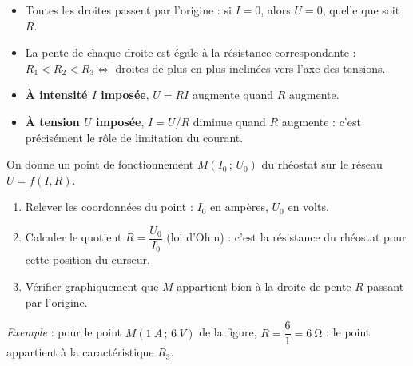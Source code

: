 \documentclass[11pt]{article}
\begin{document}
\begin{aretenir}
\begin{itemize}
\item Toutes les droites passent par l'origine : si $I = 0$, alors $U = 0$, quelle que soit $R$.
\item La pente de chaque droite est égale à la résistance correspondante : $R_1 < R_2 < R_3 \iff$ droites de plus en plus inclinées vers l'axe des tensions.
\item \textbf{À intensité $I$ imposée}, $U = R I$ augmente quand $R$ augmente.
\item \textbf{À tension $U$ imposée}, $I = U/R$ diminue quand $R$ augmente : c'est précisément le rôle de limitation du courant.
\end{itemize}
\end{aretenir}

\begin{methode}
On donne un point de fonctionnement $M(I_0\,;\,U_0)$ du rhéostat sur le réseau $U = f(I, R)$.
\begin{enumerate}
\item Relever les coordonnées du point : $I_0$ en ampères, $U_0$ en volts.
\item Calculer le quotient $R = \dfrac{U_0}{I_0}$ (loi d'Ohm) : c'est la résistance du rhéostat pour cette position du curseur.
\item Vérifier graphiquement que $M$ appartient bien à la droite de pente $R$ passant par l'origine.
\end{enumerate}
\emph{Exemple} : pour le point $M(\SI{1}{A}\,;\,\SI{6}{V})$ de la figure, $R = \dfrac{6}{1} = \SI{6}{\ohm}$ : le point appartient à la caractéristique $R_3$.
\end{methode}
\end{document}
